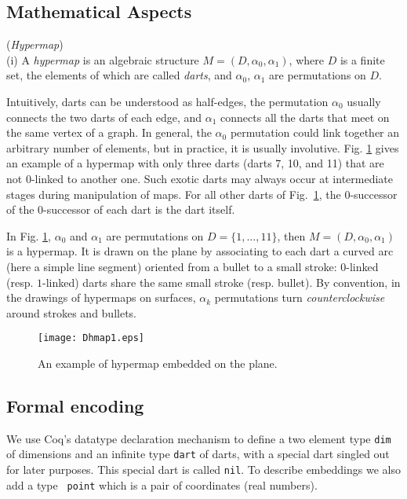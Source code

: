 \documentclass{llncs}
\begin{document}
\subsection{Mathematical Aspects}
\label{MA}

\begin{definition}({\em Hypermap})
  \label{HD}\\
  (i) A {\em hypermap} is an algebraic structure $M = (D, \alpha_0,
  \alpha_1)$, where $D$ is a finite set, the elements of which are
  called {\em darts}, and $\alpha_0$, $\alpha_1$ are permutations on $D$.\\
\end{definition}
Intuitively, darts can be understood as half-edges, the permutation
\(\alpha_0\) usually connects the two darts of each edge, and
\(\alpha_1\) connects all the darts that meet on the same vertex of a
graph.  In general, the \(\alpha_0\) permutation could
link together an arbitrary number of elements, but in practice, it is
usually involutive.  Fig. \ref{fig:Dhmap1} gives an example of a
hypermap with
only three darts (darts 7, 10, and 11) that are not 0-linked to another one.
Such exotic darts may
always occur at intermediate stages during manipulation of maps.
For all other darts of Fig.~\ref{fig:Dhmap1},
the 0-successor of the 0-successor of each dart is the dart itself.

In Fig. \ref{fig:Dhmap1}, $\alpha_0$ and $\alpha_1$ are permutations
on $D = \{1,\ldots, 11\}$, then $M = (D, \alpha_0, \alpha_1)$ is a
hypermap. It is drawn on the plane by associating to each dart a
curved arc (here a simple line segment) oriented from a bullet to a
small stroke: $0$-linked (resp. $1$-linked) darts share the same small
stroke (resp. bullet). By convention, in the drawings of hypermaps on
surfaces, \(\alpha_k\) permutations turn {\em counterclockwise} around
strokes and bullets.

\begin{figure}
\begin{center}
\texttt{[image: Dhmap1.eps]}
\end{center}
\caption{An example of hypermap embedded on the plane.}
\label{fig:Dhmap1}
\end{figure}

\subsection{Formal encoding}
\label{PS}
We use Coq's datatype declaration mechanism to define a two element
type {\tt dim} of dimensions and an infinite type {\tt dart} of darts, with a
special dart singled out for later purposes. This special dart is
called {\tt nil}. To describe embeddings we also add a type {\tt
  point} which is a pair of coordinates (real numbers).
\end{document}
